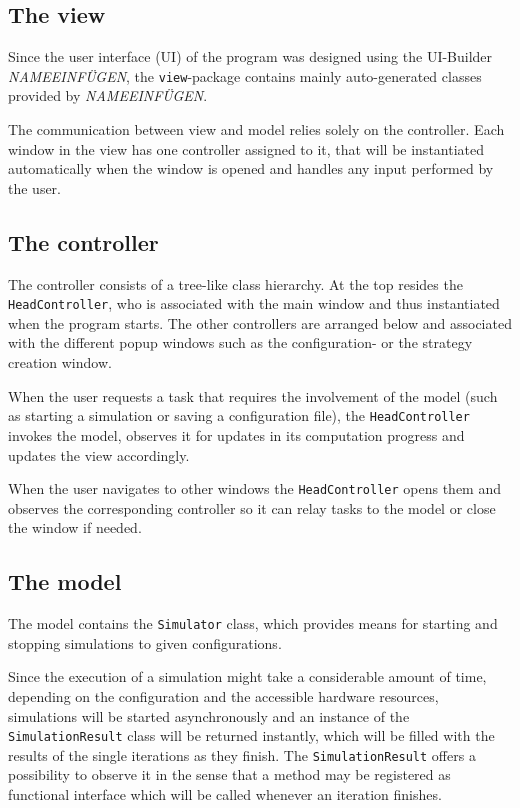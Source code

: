 \documentclass[parskip=full,11pt]{scrartcl}
\begin{document}
\subsection{The view}
Since the user interface (UI) of the program was designed using the UI-Builder \textit{NAMEEINFÜGEN}, the \texttt{view}-package contains mainly auto-generated classes provided by \textit{NAMEEINFÜGEN}.

The communication between view and model relies solely on the controller. Each window in the view has one controller assigned to it, that will be instantiated automatically when the window is opened and handles any input performed by the user.

\subsection{The controller}
The controller consists of a tree-like class hierarchy. At the top resides the \texttt{HeadController}, who is associated with the main window and thus instantiated when the program starts. The other controllers are arranged below and associated with the different popup windows such as the configuration- or the strategy creation window.

When the user requests a task that requires the involvement of the model (such as starting a simulation or saving a configuration file), the \texttt{HeadController} invokes the model, observes it for updates in its computation progress and updates the view accordingly.

When the user navigates to other windows the \texttt{HeadController} opens them and observes the corresponding controller so it can relay tasks to the model or close the window if needed.

\subsection{The model}
The model contains the \texttt{Simulator} class, which provides means for starting and stopping simulations to given configurations.

Since the execution of a simulation might take a considerable amount of time, depending on the configuration and the accessible hardware resources, simulations will be started asynchronously and an instance of the \texttt{SimulationResult} class will be returned instantly, which will be filled with the results of the single iterations as they finish. The \texttt{SimulationResult} offers a possibility to observe it in the sense that a method may be registered as functional interface which will be called whenever an iteration finishes.
\end{document}
